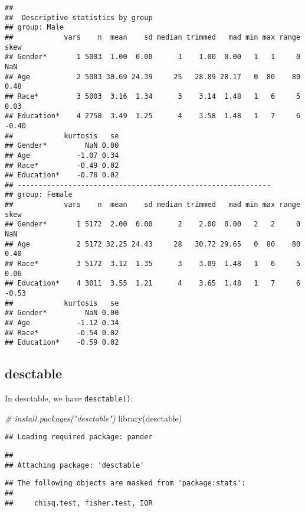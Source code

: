 \documentclass[
]{book}
\newenvironment{Shaded}{\begin{snugshade}}{\end{snugshade}}
\newcommand{\CommentTok}[1]{\textcolor[rgb]{0.56,0.35,0.01}{\textit{#1}}}
\newcommand{\FunctionTok}[1]{\textcolor[rgb]{0.00,0.00,0.00}{#1}}
\newcommand{\NormalTok}[1]{#1}
\begin{document}
\begin{verbatim}
## 
##  Descriptive statistics by group 
## group: Male
##            vars    n  mean    sd median trimmed   mad min max range  skew
## Gender*       1 5003  1.00  0.00      1    1.00  0.00   1   1     0   NaN
## Age           2 5003 30.69 24.39     25   28.89 28.17   0  80    80  0.48
## Race*         3 5003  3.16  1.34      3    3.14  1.48   1   6     5  0.03
## Education*    4 2758  3.49  1.25      4    3.58  1.48   1   7     6 -0.40
##            kurtosis   se
## Gender*         NaN 0.00
## Age           -1.07 0.34
## Race*         -0.49 0.02
## Education*    -0.78 0.02
## ------------------------------------------------------------ 
## group: Female
##            vars    n  mean    sd median trimmed   mad min max range  skew
## Gender*       1 5172  2.00  0.00      2    2.00  0.00   2   2     0   NaN
## Age           2 5172 32.25 24.43     28   30.72 29.65   0  80    80  0.40
## Race*         3 5172  3.12  1.35      3    3.09  1.48   1   6     5  0.06
## Education*    4 3011  3.55  1.21      4    3.65  1.48   1   7     6 -0.53
##            kurtosis   se
## Gender*         NaN 0.00
## Age           -1.12 0.34
## Race*         -0.54 0.02
## Education*    -0.59 0.02
\end{verbatim}

\hypertarget{desctable}{%
\subsection{desctable}\label{desctable}}

In desctable, we have \texttt{desctable()}:

\begin{Shaded}
\begin{Highlighting}[]
\CommentTok{\# install.packages("desctable")}
\FunctionTok{library}\NormalTok{(desctable)}
\end{Highlighting}
\end{Shaded}

\begin{verbatim}
## Loading required package: pander
\end{verbatim}

\begin{verbatim}
## 
## Attaching package: 'desctable'
\end{verbatim}

\begin{verbatim}
## The following objects are masked from 'package:stats':
## 
##     chisq.test, fisher.test, IQR
\end{verbatim}
\end{document}
